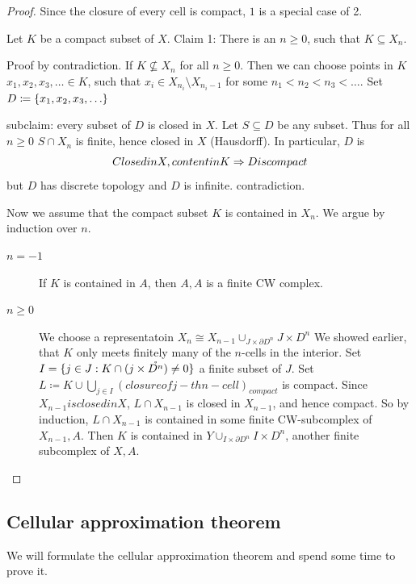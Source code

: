 \documentclass{TemplateLecture}
\begin{document}
\begin{proof}
    Since the closure of every cell is compact, \(1\) is a special case of 2.

    Let \(K\) be a compact subset of \(X\).
    Claim 1: There is an \(n \geq 0\), such that \(K \subseteq X_n\).

    Proof by contradiction. If \(K \not\subseteq X_n\) for all \(n \geq 0\). Then we can choose points in \(K\) \(x_1, x_2, x_3, \dots \in K\), such that \(x_i \in X_{n_i} \setminus X_{n_i -1}\) for some \(n_1 < n_2 < n_3 < \dots\).
    Set \(D\coloneq \set{x_1, x_2, x_3, \dots}\)

    subclaim: every subset of \(D\) is closed in \(X\).
    Let \(S\subseteq D\) be any subset. Thus for all \(n \geq 0\) \(S\cap X_n\) is finite, hence closed in \(X\) (Hausdorff). In particular, \(D\) is
    \[Closed in X, content in K \Rightarrow D is compact\]
    but \(D\) has discrete topology and \(D\) is infinite. contradiction.

    Now we assume that the compact subset \(K\) is contained in \(X_n\). We argue by induction over \(n\).
    \begin{description}
        \item[\(n = -1\)] If \(K\) is contained in \(A\), then  \(A,A\) is a finite CW complex.
        \item[\(n \geq 0\)] We choose a representatoin \(X_n \cong X_{n-1} \cup_{J\times \partial D^n} J\times D^n\) We showed earlier, that \(K\) only meets finitely many of the \(n\)-cells in the interior. Set \(I = \{j \in J : K \cap (j\times \mathring{D^n}) \neq 0\}\) a finite subset of \(J\).
        Set \(L \coloneq K \cup \bigcup_{j \in I} (closure of j-th n-cell)_{compact}\) is compact.
        Since \(X_{n-1} is closed in X\), \(L\cap X_{n-1}\) is closed in \(X_{n-1}\), and hence compact. So by induction, \(L\cap X_{n-1}\) is contained in some finite CW-subcomplex of \(X_{n-1},A\). Then \(K\) is contained in \(Y \cup_{I\times \partial D^n} I\times D^n\), another finite subcomplex of \(X,A\).
    \end{description}
\end{proof}

    \subsection{Cellular approximation theorem}

    We will formulate the cellular approximation theorem and spend some time to prove it.
\end{document}
